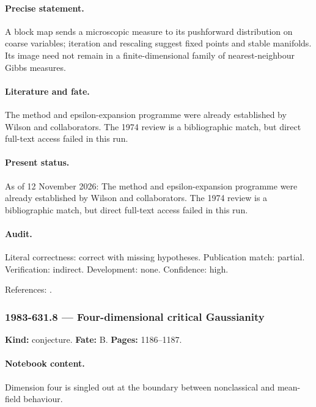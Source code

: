 \paragraph{Precise statement.} A block map sends a microscopic measure to its pushforward distribution on coarse variables; iteration and rescaling suggest fixed points and stable manifolds. Its image need not remain in a finite-dimensional family of nearest-neighbour Gibbs measures.

\paragraph{Literature and fate.} The method and epsilon-expansion programme were already established by Wilson and collaborators. The 1974 review is a bibliographic match, but direct full-text access failed in this run.

\paragraph{Present status.} As of 12 November 2026: The method and epsilon-expansion programme were already established by Wilson and collaborators. The 1974 review is a bibliographic match, but direct full-text access failed in this run.

\paragraph{Audit.} Literal correctness: correct with missing hypotheses. Publication match: partial. Verification: indirect. Development: none. Confidence: high.

\noindent References: \citep{wilsonkogut1974renormalization}.\par

\subsubsection{1983-631.8 --- Four-dimensional critical Gaussianity}

\label{item:1983-631.8}

\noindent\textbf{Kind:} conjecture. \textbf{Fate:} B. \textbf{Pages:} 1186--1187.\par

\paragraph{Notebook content.} Dimension four is singled out at the boundary between nonclassical and mean-field behaviour.

